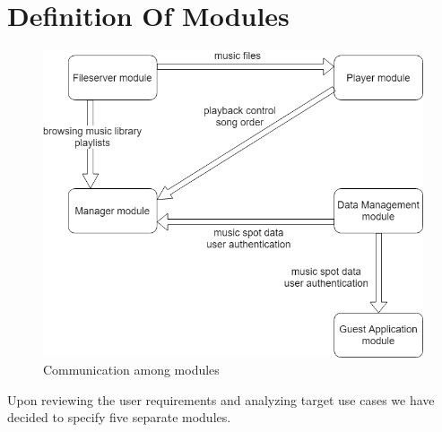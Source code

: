\section{Definition Of Modules}

\begin{figure}[ht]\centering
\includegraphics[width=1.0\textwidth]{img/CommunicationGraph2}
\caption{Communication among modules}
\label{fig02:communicationAmongModules}
\end{figure}

Upon reviewing the user requirements and analyzing target use cases we have decided to specify five separate modules.

